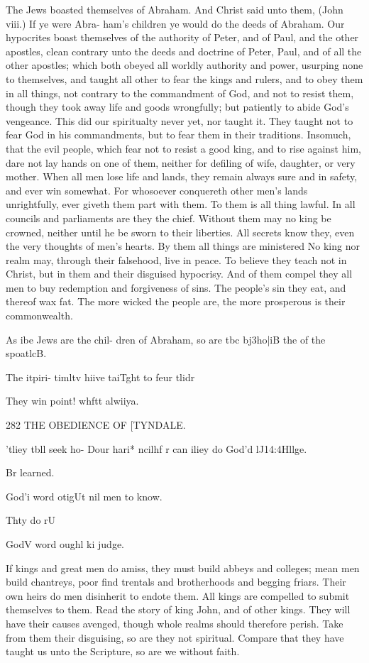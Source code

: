 \documentclass{custom}
\begin{document}
{{The Jews boasted themselves of Abraham. And 
Christ said unto them, (John viii.) If ye were Abra- 
ham's children ye would do the deeds of Abraham. Our 
hypocrites boast themselves of the authority of Peter, and of 
Paul, and the other apostles, clean contrary unto the deeds 
and doctrine of Peter, Paul, and of all the other apostles; 
which both obeyed all worldly authority and power, 
usurping none to themselves, and taught all other to fear 
the kings and rulers, and to obey them in all things, not 
contrary to the commandment of God, and not to resist 
them, though they took away life and goods wrongfully; 
but patiently to abide God's vengeance. This did our 
spiritualty never yet, nor taught it. They taught not to 
fear God in his commandments, but to fear them in their 
traditions. Insomuch, that the evil people, which fear 
not to resist a good king, and to rise against him, dare 
not lay hands on one of them, neither for defiling of wife, 
daughter, or very mother. When all men lose life and 
lands, they remain always sure and in safety, and ever 
win somewhat. For whosoever conquereth other men's 
lands unrightfully, ever giveth them part with them. To 
them is all thing lawful. In all councils and parliaments 
are they the chief. Without them may no king be 
crowned, neither until he be sworn to their liberties. 
All secrets know they, even the very thoughts of men's 
hearts. By them all things are ministered No king nor 
realm may, through their falsehood, live in peace. To 
believe they teach not in Christ, but in them and their 
disguised hypocrisy. And of them compel they all men 
to buy redemption and forgiveness of sins. The people's 
sin they eat, and thereof wax fat. The more wicked the 
people are, the more prosperous is their commonwealth. 

As ibe 
Jews are 
the chil- 
dren of 
Abraham, 
so are tbc 
bj3ho|iB the 
of the 
spoatlcB. 

The itpiri- 
timltv 
hiive 
taiTght to 
feur tlidr 

They win 
point! whftt 
alwiiya. 


282
THE OBEDIENCE OF
[TYNDALE.

'tliey tbll 
seek ho- 
Dour hari* 
ncilhf r can 
iliey do 
God'd 
lJ14:4Hllge. 

Br learned. 

God'i word 
otigUt nil 
men to 
know. 

Thty do rU 

GodV word 
oughl ki 
judge. 

If kings and great men do amiss, they must build abbeys 
and colleges; mean men build chantreys, poor find 
trentals and brotherhoods and begging friars. Their own 
heirs do men disinherit to endote them. All kings are 
compelled to submit themselves to them. Read the story 
of king John, and of other kings. They will have their 
causes avenged, though whole realms should therefore 
perish. Take from them their disguising, so are they not 
spiritual. Compare that they have taught us unto the 
Scripture, so are we without faith. 

}}
\end{document}
